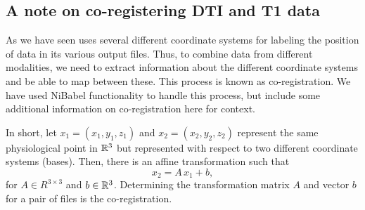 


\subsection{A note on co-registering DTI and T1 data}
\label{sec:chp-dti:freesurfer-coord}

As we have seen {\freesurfer} uses several different coordinate
systems for labeling the position of data in its various output
files. Thus, to combine data from different modalities, we need to
extract information about the different coordinate systems and be able
to map between these. This process is known as co-registration. We
have used NiBabel functionality to handle this process, but
include some additional information on co-registration here for context.


In short, let $x_1 = (x_1, y_1, z_1)$ and $x_2 = (x_2, y_2, z_2)$ represent the
same physiological point in $\mathbb{R}^3$ but represented with respect to two
different coordinate systems (bases). Then, there is an affine
transformation such that
\begin{equation} 
x_2 = A\, x_1 + b,
\end{equation}
for $A \in R^{3 \times 3}$ and $b \in \mathbb{R}^3$. Determining the
transformation matrix $A$ and vector $b$ for a pair of files is the
co-registration.

